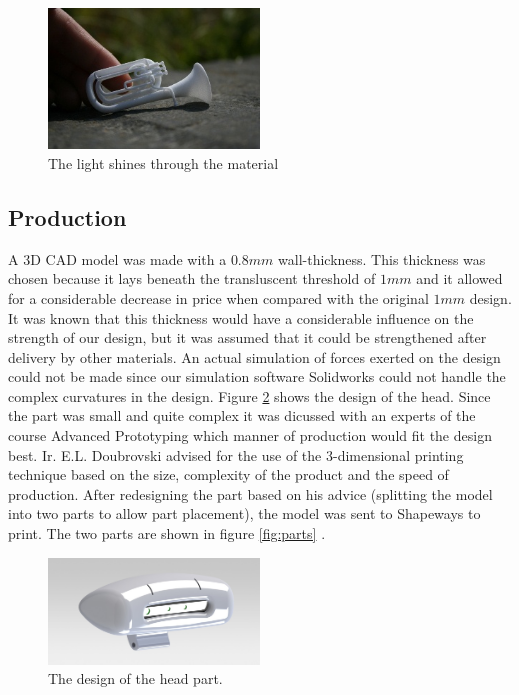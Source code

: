\documentclass[technical_document.tex]{subfiles}
\begin{document}
\begin{figure}[h]
	\centering
	\mbox{\includegraphics[width=0.5\textwidth]{Images/polish_horn_finger_thumb.png}}
	\caption{The light shines through the material}
	\label{fig:finger}
\end{figure}

\subsection*{Production}
A 3D CAD model was made with a $0.8 mm$ wall-thickness. This thickness was chosen because it lays beneath the transluscent threshold of $1 mm$ and it allowed for a considerable decrease in price when compared with the original $1 mm$ design. It was known that this thickness would have a considerable influence on the strength of our design, but it was assumed that it could be strengthened after delivery by other materials. An actual simulation of forces exerted on the design could not be made since our simulation software Solidworks could not handle the complex curvatures in the design. Figure \ref{fig:head} shows the design of the head. Since the part was small and quite complex it was dicussed with an experts of the course Advanced Prototyping which manner of production would fit the design best. Ir. E.L. Doubrovski advised for the use of the 3-dimensional printing technique based on the size, complexity of the product and the speed of production. After redesigning the part based on his advice (splitting the model into two parts to allow part placement), the model was sent to Shapeways to print. The two parts are shown in figure \ref{fig:parts} .

\begin{figure}[h]
	\centering
	\mbox{\includegraphics[width=0.5\textwidth]{Images/SW_fullheadmodel.png}}
	\caption{The design of the head part.}
	\label{fig:head}
\end{figure}
\end{document}
